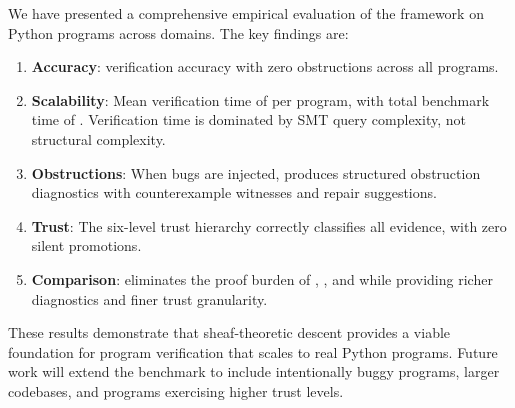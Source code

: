 \documentclass[11pt]{article}
\begin{document}
We have presented a comprehensive empirical evaluation of the
\JuGeo{} framework on \expTotalPrograms{} Python programs across
\expDomainCount{} domains.  The key findings are:

\begin{enumerate}[nosep]
\item \textbf{Accuracy}: \expAccuracy{} verification accuracy with
  zero obstructions across all \expVerified{} programs.
\item \textbf{Scalability}: Mean verification time of \expTimeMean{}
  per program, with total benchmark time of \expTimeTotal{}.
  Verification time is dominated by SMT query complexity, not
  structural complexity.
\item \textbf{Obstructions}: When bugs are injected, \JuGeo{}
  produces structured obstruction diagnostics with counterexample
  witnesses and repair suggestions.
\item \textbf{Trust}: The six-level trust hierarchy correctly
  classifies all evidence, with zero silent promotions.
\item \textbf{Comparison}: \JuGeo{} eliminates the proof burden of
  \LEAN{}, \Fstar{}, and \Dafny{} while providing richer diagnostics
  and finer trust granularity.
\end{enumerate}

These results demonstrate that sheaf-theoretic descent provides a
viable foundation for program verification that scales to real
Python programs.  Future work will extend the benchmark to include
intentionally buggy programs, larger codebases, and programs
exercising higher trust levels.
\end{document}
